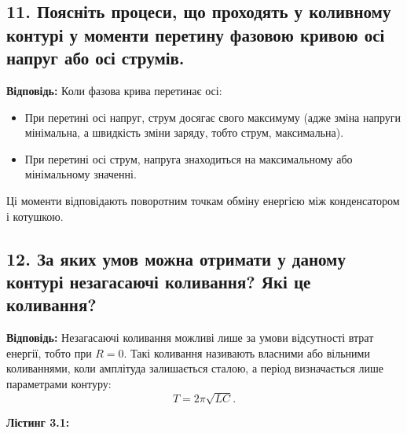 \documentclass[12pt,a4paper]{article}
\begin{document}
    \subsection*{11. Поясніть процеси, що проходять у коливному контурі у моменти перетину фазовою кривою осі напруг або осі струмів.}
    \textbf{Відповідь:}  
    Коли фазова крива перетинає осі:
    \begin{itemize}
        \item При перетині осі напруг, струм досягає свого максимуму (адже зміна напруги мінімальна, а швидкість зміни заряду, тобто струм, максимальна).
        \item При перетині осі струм, напруга знаходиться на максимальному або мінімальному значенні.
    \end{itemize}
    Ці моменти відповідають поворотним точкам обміну енергією між конденсатором і котушкою.

    \subsection*{12. За яких умов можна отримати у даному контурі незагасаючі коливання? Які це коливання?}
    \textbf{Відповідь:}  
    Незагасаючі коливання можливі лише за умови відсутності втрат енергії, тобто при $R=0$.  
    Такі коливання називають власними або вільними коливаннями, коли амплітуда залишається сталою, а період визначається лише параметрами контуру:
    \[
    T = 2\pi\sqrt{LC}.
    \]

    \newpage

    \hypertarget{listing1}{}

    \textbf{\large Лістинг 3.1:}

    \vspace{1em}
\end{document}
